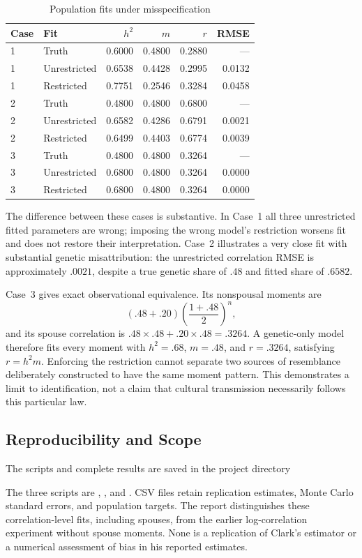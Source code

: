 \begin{table}[htbp]
\centering
\caption{Population fits under misspecification}
\label{tab:misspecification}
\begin{tabular}{llrrrr}
\hline
Case & Fit & $h^2$ & $m$ & $r$ & RMSE\\
\hline
1 & Truth & 0.6000 & 0.4800 & 0.2880 & --- \\
1 & Unrestricted & 0.6538 & 0.4428 & 0.2995 & 0.0132 \\
1 & Restricted & 0.7751 & 0.2546 & 0.3284 & 0.0458 \\
2 & Truth & 0.4800 & 0.4800 & 0.6800 & --- \\
2 & Unrestricted & 0.6582 & 0.4286 & 0.6791 & 0.0021 \\
2 & Restricted & 0.6499 & 0.4403 & 0.6774 & 0.0039 \\
3 & Truth & 0.4800 & 0.4800 & 0.3264 & --- \\
3 & Unrestricted & 0.6800 & 0.4800 & 0.3264 & 0.0000 \\
3 & Restricted & 0.6800 & 0.4800 & 0.3264 & 0.0000 \\
\hline
\end{tabular}
\end{table}

The difference between these cases is substantive. In Case~1 all three
unrestricted fitted parameters are wrong; imposing the wrong model's
restriction worsens fit and does not restore their interpretation.
Case~2 illustrates a very close fit with substantial genetic misattribution:
the unrestricted correlation RMSE is approximately $.0021$, despite a
true genetic share of $.48$ and fitted share of $.6582$.

Case~3 gives exact observational equivalence. Its nonspousal moments are
\[
 \left(.48+.20\right)\left(\frac{1+.48}{2}\right)^n,
\]
and its spouse correlation is $.48\times.48+.20\times.48=.3264$.
A genetic-only model therefore fits every moment with $h^2=.68$, $m=.48$,
and $r=.3264$, satisfying $r=h^2m$. Enforcing the restriction cannot
separate two sources of resemblance deliberately constructed to have the
same moment pattern. This demonstrates a limit to identification, not a
claim that cultural transmission necessarily follows this particular law.

\subsection{Reproducibility and Scope}
The scripts and complete results are saved in the project directory
\begin{center}\small
{}
\end{center}
The three scripts are , , and
. CSV files retain replication estimates, Monte
Carlo standard errors, and population targets. The report distinguishes
these correlation-level fits, including spouses, from the earlier
log-correlation experiment without spouse moments. None is a replication
of Clark's estimator or a numerical assessment of bias in his reported
estimates.
